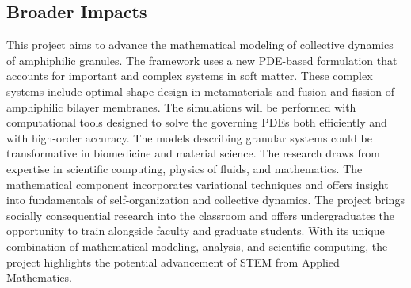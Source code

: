 \documentclass[11pt]{article}
\begin{document}
\subsection*{Broader Impacts}
\vspace{-0.1in}
This project aims to advance the mathematical modeling of collective
dynamics of amphiphilic granules. The framework uses a new PDE-based
formulation that accounts for important and complex systems in soft
matter. These complex systems include optimal shape design in
metamaterials and fusion and fission of amphiphilic bilayer membranes.
The simulations will be performed with computational tools designed to
solve the governing PDEs both efficiently and with high-order accuracy.
The models describing granular systems could be transformative in
biomedicine and material science. The research draws from expertise in
scientific computing, physics of fluids, and mathematics. The
mathematical component incorporates variational techniques and offers
insight into fundamentals of self-organization and collective dynamics.
The project brings socially consequential research into the classroom
and offers undergraduates the opportunity to train alongside faculty and
graduate students. With its unique combination of mathematical modeling,
analysis, and scientific computing, the project highlights the potential
advancement of STEM from Applied Mathematics.
\end{document}
